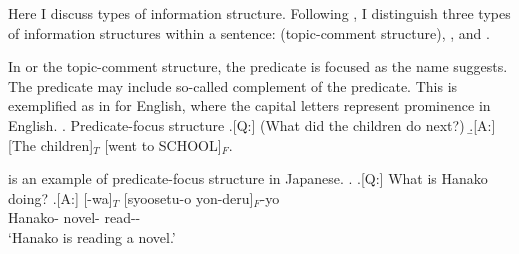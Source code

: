 Here I discuss types of information structure.
Following ,
I distinguish three types of information structures within a sentence:
 (topic-comment structure),
, and
.

In  or the topic-comment structure,
the predicate is focused as the name suggests.
The predicate may include so-called complement of the predicate.
This is exemplified as in \Next[A] for English,
where the capital letters represent prominence in English.
\ex. Predicate-focus structure
	\a.[Q:] (What did the children do next?)
	\b.[A:] [The children]$_{T}$ [went to SCHOOL]$_{F}$.
	\hfill{\cite[][p.\ 121]{lambrecht94}}

\Next[A] is an example of predicate-focus structure in Japanese.
%
\ex.
 \a.[Q:] What is Hanako doing?
 \bg.[A:] [-wa]$_{T}$ [syoosetu-o yon-deru]$_{F}$-yo \\
		Hanako- novel- read-- \\
		`Hanako is reading a novel.'

